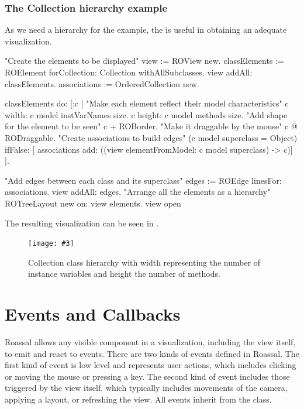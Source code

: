 \documentclass[a4paper,10pt,twoside]{book}
\newcommand{\fig}[4]{
		\begin{figure}[#1]
			\centering
			\texttt{[image: \#3]}
			\caption{\label{fig:#3}#4}
		\end{figure}}
\begin{document}
\subsubsection{The Collection hierarchy example}

As we need a hierarchy for the  example, the  is useful in obtaining an adequate visualization.

\begin{code}{}
"Create the elements to be displayed"
view := ROView new.
classElements := ROElement forCollection: Collection withAllSubclasses.
view addAll: classElements.
associations := OrderedCollection new.
\end{code}

\begin{code}{}
classElements do: [:c | 
		"Make each element reflect their model characteristics"
	c width: c model instVarNames size.
	c height: c model methods size.
		"Add shape for the element to be seen"
	c + ROBorder. 
		"Make it draggable by the mouse"
	c @ RODraggable.
		"Create associations to build edges"
	(c model superclass = Object)
		ifFalse: [ associations add: ((view elementFromModel: c model superclass) -> c)]	
	 ].
\end{code}

\begin{code}{}	 
	"Add edges between each class and its superclass"
edges := ROEdge linesFor: associations.
view addAll: edges.
	"Arrange all the elements as a hierarchy"
ROTreeLayout new on: view elements.
view open
\end{code}


The resulting visualization can be seen in .

\fig{H}{0.35}{collectionHierarchy}{Collection class hierarchy with width representing the number of instance variables and height the number of methods.}


\section{Events and Callbacks}

Roassal allows any visible component in a visualization, including the view itself, to emit and react to events. There are two kinds of events defined in Roassal. The first kind of event is low level and represents user actions, which includes clicking or moving the mouse or pressing a key. The second kind of event includes those triggered by the view itself, which typically includes movements of the camera, applying a layout, or refreshing the view. All events inherit from the  class.
\end{document}
